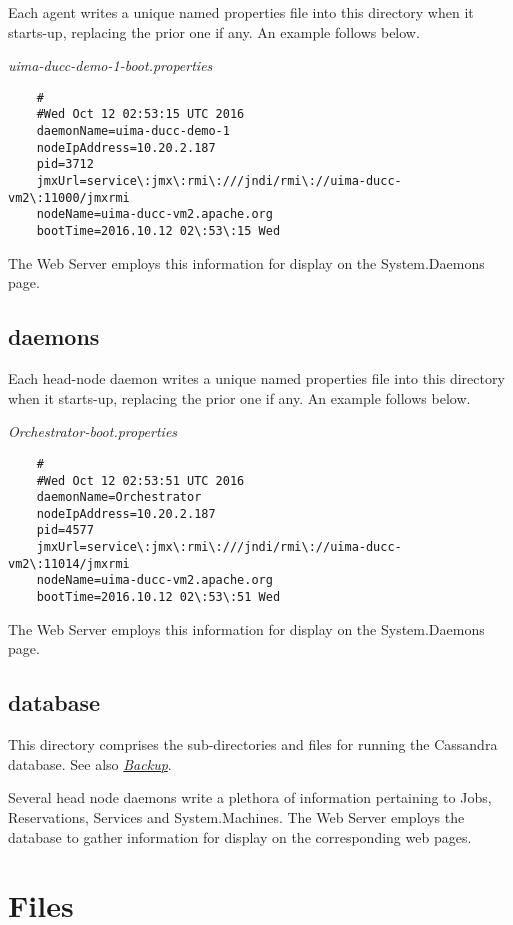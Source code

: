 	Each agent writes a unique named properties file into this 
	directory when it starts-up, replacing the prior one if any.
	An example follows below.

	{\em uima-ducc-demo-1-boot.properties}
	\begin{verbatim}
	#
	#Wed Oct 12 02:53:15 UTC 2016
	daemonName=uima-ducc-demo-1
	nodeIpAddress=10.20.2.187
	pid=3712
	jmxUrl=service\:jmx\:rmi\:///jndi/rmi\://uima-ducc-vm2\:11000/jmxrmi
	nodeName=uima-ducc-vm2.apache.org
	bootTime=2016.10.12 02\:53\:15 Wed
	\end{verbatim}
	
	The {\DUCC} Web Server employs this information for display
	on the System.Daemons page.
	
	\subsection{daemons}
	
	Each head-node daemon writes a unique named properties file into this
	directory when it starts-up, replacing the prior one if any.
	An example follows below.
	
	{\em Orchestrator-boot.properties}
	\begin{verbatim}
	#
	#Wed Oct 12 02:53:51 UTC 2016
	daemonName=Orchestrator
	nodeIpAddress=10.20.2.187
	pid=4577
	jmxUrl=service\:jmx\:rmi\:///jndi/rmi\://uima-ducc-vm2\:11014/jmxrmi
	nodeName=uima-ducc-vm2.apache.org
	bootTime=2016.10.12 02\:53\:51 Wed
	\end{verbatim}
	
	The {\DUCC} Web Server employs this information for display 
	on the System.Daemons page.
	
	\subsection{database}
	
	This directory comprises the sub-directories and files for running
	the {\DUCC} Cassandra database.
	See also \hyperref[sec:state-directory.backup]{\em Backup}.
	
	Several {\DUCC} head node daemons write a plethora of information
	pertaining to Jobs, Reservations, Services and System.Machines.
	The {\DUCC} Web Server employs the database to gather information for display
	on the corresponding web pages.
	
	\section{Files}
	
